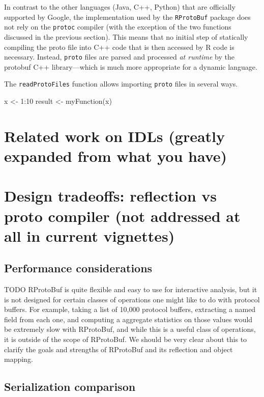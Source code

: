 In contrast to the other languages (Java, C++, Python) that are officially
supported by Google, the implementation used by the \texttt{RProtoBuf}
package does not rely on the \texttt{protoc} compiler (with the exception of
the two functions discussed in the previous section). This means that no
initial step of statically compiling the proto file into C++ code that is
then accessed by R code is necessary. Instead, \texttt{proto} files are
parsed and processed \textsl{at runtime} by the protobuf C++ library---which
is much more appropriate for a dynamic language.

The \texttt{readProtoFiles} function allows importing \texttt{proto}
files in several ways.

\begin{example}
  x <- 1:10
  result <- myFunction(x)
\end{example}

\section{Related work on IDLs (greatly expanded from what you have)}

\section{Design tradeoffs: reflection vs proto compiler (not addressed
  at all in current vignettes)}

\subsection{Performance considerations}

TODO RProtoBuf is quite flexible and easy to use for interactive
analysis, but it is not designed for certain classes of operations one
might like to do with protocol buffers.  For example, taking a list of
10,000 protocol buffers, extracting a named field from each one, and
computing a aggregate statistics on those values would be extremely
slow with RProtoBuf, and while this is a useful class of operations,
it is outside of the scope of RProtoBuf.  We should be very clear
about this to clarify the goals and strengths of RProtoBuf and its
reflection and object mapping.

\subsection{Serialization comparison}


